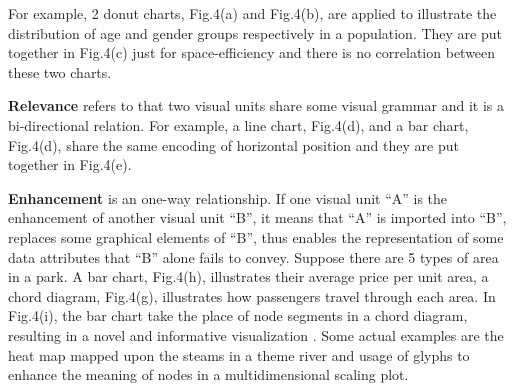 For example, 2 donut charts, Fig.4(a) and Fig.4(b), are applied to illustrate the distribution of age and gender groups respectively in a population. They are put together in Fig.4(c) just for space-efficiency and there is no correlation between these two charts. 

\textbf{Relevance} refers to that two visual units share some visual grammar and it is a bi-directional relation. 
For example, a line chart, Fig.4(d), and a bar chart, Fig.4(d), share the same encoding of horizontal position and they are put together in Fig.4(e).  

\textbf{Enhancement} is an one-way relationship. If one visual unit ``A'' is the enhancement of another visual unit ``B'', it means that ``A'' is imported into ``B'', replaces some graphical elements of ``B'', thus enables the representation of some data attributes that ``B'' alone fails to convey. Suppose there are 5 types of area in a park. A bar chart, Fig.4(h), illustrates their average price per unit area, a chord diagram, Fig.4(g), illustrates how passengers travel through each area. In Fig.4(i), the bar chart take the place of node segments in a chord diagram, resulting in a novel and informative visualization . 
Some actual examples are the heat map mapped upon the steams in a theme river\cite{wu_opinionflow:_2014}  and usage of glyphs to enhance the meaning of nodes in a multidimensional scaling plot.\cite{chen_peakvizor:_2016} 

